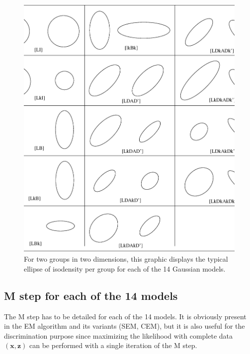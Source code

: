 \documentclass[12pt]{article}
\newcommand{\bx}{\mathbf{x}}
\newcommand{\bz}{\mathbf{z}}
\begin{document}
\begin{figure}[http]
  \centering
  \includegraphics[width=14cm]{model.eps}
  \caption{For two groups in two dimensions, this graphic displays the typical ellipse of
    isodensity per group for each of the 14 Gaussian models.}
  \label{GraphicCovarianceStructure}
\end{figure}

\subsection{M step for each of the 14 models}
The M step has to be detailed for each of the 14 models. It is obviously present in the EM
algorithm and its variants (SEM, CEM), but it is also useful for the discrimination purpose
since maximizing the likelihood with complete data $(\bx,\bz)$ can be performed with a single
iteration of the M step.
\end{document}
